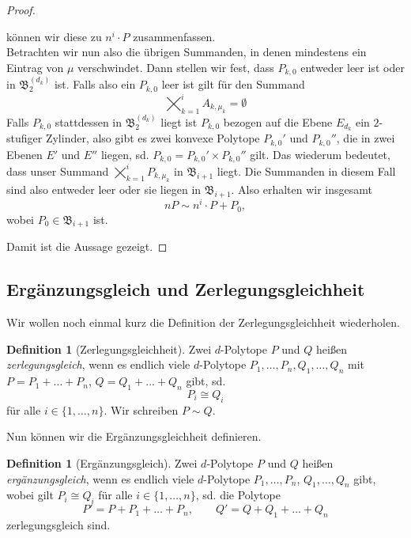 \documentclass[11pt,titlepage]{article}
\theoremstyle{definition}
\newtheorem{definition}[theorem]{Definition}
\theoremstyle{remark}
\begin{document}
\begin{proof}
\begin{enumerate}
			können wir diese zu $n^i \cdot P$ zusammenfassen. \\
			Betrachten wir nun also die übrigen Summanden, in denen mindestens 
			ein Eintrag von $\mu$ verschwindet. Dann stellen wir fest, dass 
			$P_{k,0}$ entweder leer ist oder in $\mathfrak{B}_2^{(d_k)}$ ist. 
			Falls also ein $P_{k,0}$ leer ist gilt für den Summand
			\[\bigtimes_{k=1}^i A_{k,\mu_k}=\emptyset\]
			Falls $P_{k,0}$ stattdessen in $\mathfrak{B}_2^{(d_k)}$ liegt 
			ist $P_{k,0}$ bezogen auf die Ebene $E_{d_k}$ ein $2$-stufiger 
			Zylinder, also gibt es zwei konvexe Polytope $P_{k,0}'$ 
			und $P_{k,0}''$, die in zwei Ebenen $E'$ und $E''$ liegen, sd. 
			$P_{k,0}=P_{k,0}'\times P_{k,0}''$ gilt. 
			Das wiederum bedeutet, dass unser Summand 
			$\bigtimes_{k=1}^i P_{k,\mu_k}$ in $\mathfrak{B}_{i+1}$ liegt. 
			Die Summanden in diesem Fall sind also entweder leer oder sie 
			liegen in $\mathfrak{B}_{i+1}$.
			Also erhalten wir insgesamt
			\[nP\sim n^i\cdot P + P_0,\]
			wobei $P_0\in \mathfrak{B}_{i+1}$ ist.
		\end{enumerate}
		Damit ist die Aussage gezeigt.
	\end{proof}
	
	\subsection{Ergänzungsgleich und Zerlegungsgleichheit}
	
	Wir wollen noch einmal kurz die Definition der Zerlegungsgleichheit wiederholen.
	
	\begin{definition}[Zerlegungsgleichheit]
		Zwei $d$-Polytope $P$ und $Q$ heißen \textsl{zerlegungsgleich}, wenn es endlich viele $d$-Polytope 
		$P_1,\ldots,P_n,Q_1,\ldots,Q_n$ mit $P=P_1 +\ldots +P_n$,  $Q=Q_1 +\ldots+Q_n$ 
		gibt, sd. 
		\[P_i\cong Q_i\]
		für alle $i\in\{1,\ldots,n\}$. Wir schreiben $P\sim Q$.
	\end{definition}
	
	Nun können wir die Ergänzungsgleichheit definieren.
	
	\begin{definition}[Ergänzungsgleich]
		Zwei $d$-Polytope $P$ und $Q$ heißen \textsl{ergänzungsgleich}, wenn es endlich viele $d$-Polytope 
		$P_1,\ldots,P_n$, $Q_1,\ldots,Q_n$ gibt, wobei gilt $P_i\cong Q_i$ für alle $i\in\{1,\ldots,n\}$, sd. die Polytope
		\[P'=P+P_1+\ldots+P_n,\qquad Q'=Q+Q_1+\ldots+Q_n\]
		zerlegungsgleich sind.
	\end{definition}
	
\end{document}
